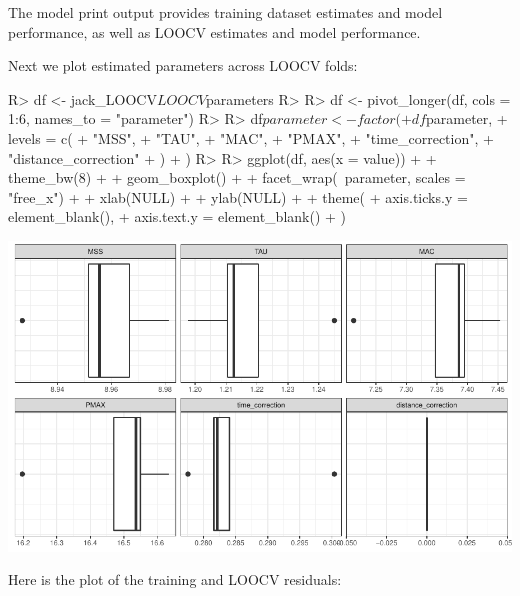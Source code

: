 \documentclass[
]{jss}
\begin{document}
The model print output provides training dataset estimates and model performance, as well as LOOCV estimates and model performance.

Next we plot estimated parameters across LOOCV folds:

\begin{CodeChunk}
\begin{CodeInput}
R> df <- jack_LOOCV$LOOCV$parameters
R> 
R> df <- pivot_longer(df, cols = 1:6, names_to = "parameter")
R> 
R> df$parameter <- factor(
+   df$parameter,
+   levels = c(
+     "MSS",
+     "TAU",
+     "MAC",
+     "PMAX",
+     "time_correction",
+     "distance_correction"
+   )
+ )
R> 
R> ggplot(df, aes(x = value)) +
+   theme_bw(8) +
+   geom_boxplot() +
+   facet_wrap(~parameter, scales = "free_x") +
+   xlab(NULL) +
+   ylab(NULL) +
+   theme(
+     axis.ticks.y = element_blank(),
+     axis.text.y = element_blank()
+   )
\end{CodeInput}


\begin{center}\includegraphics[width=1\linewidth]{paper_files/figure-latex/unnamed-chunk-46-1} \end{center}

\end{CodeChunk}

Here is the plot of the training and LOOCV residuals:
\end{document}
